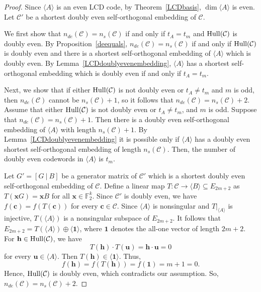 \documentclass{article}
\theoremstyle{definition}
\theoremstyle{remark}
\begin{document}
\begin{proof}
    Since $\langle A\rangle$ is an even LCD code, by Theorem~\ref{LCDbasis}, $\dim\langle A\rangle$ is even. Let $\mathcal{C}'$ be a shortest doubly even self-orthogonal embedding of $\mathcal{C}$. 
    
    We first show that $n_{de}(\mathcal{C})=n_s(\mathcal{C})$ if and only if $t_A=t_m$ and ${\rm{Hull}}(\mathcal{C})$ is doubly even. By Proposition~\ref{deequals}, $n_{de}(\mathcal{C})=n_s(\mathcal{C})$ if and only if ${\rm{Hull}}(\mathcal{C})$ is doubly even and there is a shortest self-orthogonal embedding of $\langle A\rangle$ which is doubly even. By Lemma~\ref{LCDdoublyevenembedding}, $\langle A\rangle$ has a shortest self-orthogonal embedding which is doubly even if and only if $t_A=t_m$.

    Next, we show that if either ${\rm Hull}(\mathcal C)$ is not doubly even or $t_A\ne t_m$ and $m$ is odd, then $n_{de}(\mathcal{C})$ cannot be $n_s(\mathcal{C})+1$, so it follows that $n_{de}(\mathcal{C})=n_s(\mathcal{C})+2$. Assume that either ${\rm Hull}(\mathcal C)$ is not doubly even or $t_A\ne t_m$, and $m$ is odd. Suppose that $n_{de}(\mathcal{C})=n_s(\mathcal{C})+1$. Then there is a doubly even self-orthogonal embedding of $\langle A\rangle$ with length $n_s(\mathcal{C})+1$. By Lemma~\ref{LCDdoublyevenembedding} it is possible only if $\langle A\rangle$ has a doubly even shortest self-orthogonal embedding of length $n_s(\mathcal{C})$. Then, the number of doubly even codewords in $\langle A\rangle$ is $t_m$. 
    
    Let $G'=[G~|~B]$ be a generator matrix of $\mathcal{C}'$ which is a shortest doubly even self-orthogonal embedding of $\mathcal{C}$. Define a linear map $T:\mathcal{C}\to \langle B\rangle\subseteq E_{2m+2}$ as $T(\mathbf{x}G)=\mathbf{x}B$ for all $\mathbf{x}\in\mathbb{F}_2^{k}$. Since $\mathcal{C}'$ is doubly even, we have $f(\mathbf{c})=f(T(\mathbf{c}))$ for every $\mathbf{c}\in\mathcal{C}$. Since $\langle A\rangle$ is nonsingular and $T|_{\langle A\rangle}$ is injective, $T(\langle A\rangle)$ is a nonsingular subspace of $E_{2m+2}$. It follows that $E_{2m+2}=T(\langle A\rangle)\oplus\langle \mathbf{1}\rangle$, where $\mathbf{1}$ denotes the all-one vector of length $2m+2$. For $\mathbf{h}\in {\rm{Hull}}(\mathcal{C})$, we have
    \[
    T(\mathbf{h})\cdot T(\mathbf{u})=\mathbf{h}\cdot \mathbf{u}=0
    \]
    for every $\mathbf{u}\in\langle A\rangle$. Then $T(\mathbf{h})\in\langle\mathbf{1}\rangle$. Thus,
    \[
    f(\mathbf{h})=f(T(\mathbf{h}))=f(\mathbf{1})=m+1=0.
    \]
    Hence, ${\rm{Hull}}(\mathcal{C})$ is doubly even, which contradicts our assumption. So, $n_{de}(\mathcal{C})=n_s(\mathcal{C})+2$.


\end{proof}
\end{document}
